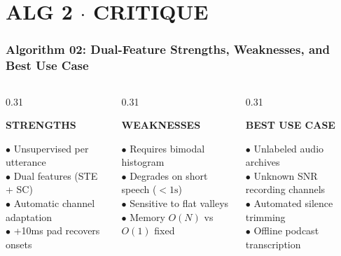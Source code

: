 \documentclass[aspectratio=169, 10pt]{beamer}
\begin{document}
\section{ALG 2 $\cdot$ CRITIQUE}
\begin{frame}
  \frametitle{Algorithm 02: Dual-Feature Strengths, Weaknesses, and Best Use Case}
  \begin{tcolorbox}[contentframe]
  \begin{columns}[T]
    \begin{column}{0.31\textwidth}
      \begin{tcolorbox}[mintcard, height=3.85cm, valign=top]
        \centering
        {\fontsize{9.5pt}{11pt}\selectfont\color{mintGreen}\textbf{STRENGTHS}}\\[4pt]
        \raggedright{\fontsize{8.5pt}{10pt}\selectfont
        $\bullet$ Unsupervised per utterance\\[3pt]
        $\bullet$ Dual features (STE + SC)\\[3pt]
        $\bullet$ Automatic channel adaptation\\[3pt]
        $\bullet$ +10ms pad recovers onsets}
      \end{tcolorbox}
    \end{column}

    \begin{column}{0.31\textwidth}
      \begin{tcolorbox}[warncard, height=3.85cm, valign=top]
        \centering
        {\fontsize{9.5pt}{11pt}\selectfont\color{amberWarn}\textbf{WEAKNESSES}}\\[4pt]
        \raggedright{\fontsize{8.5pt}{10pt}\selectfont
        $\bullet$ Requires bimodal histogram\\[3pt]
        $\bullet$ Degrades on short speech ($<1\text{s}$)\\[3pt]
        $\bullet$ Sensitive to flat valleys\\[3pt]
        $\bullet$ Memory $O(N)$ vs $O(1)$ fixed}
      \end{tcolorbox}
    \end{column}

    \begin{column}{0.31\textwidth}
      \begin{tcolorbox}[glowcard, height=3.85cm, valign=top]
        \centering
        {\fontsize{9.5pt}{11pt}\selectfont\color{cyanGlow}\textbf{BEST USE CASE}}\\[4pt]
        \raggedright{\fontsize{8.5pt}{10pt}\selectfont
        $\bullet$ Unlabeled audio archives\\[3pt]
        $\bullet$ Unknown SNR recording channels\\[3pt]
        $\bullet$ Automated silence trimming\\[3pt]
        $\bullet$ Offline podcast transcription}
      \end{tcolorbox}
    \end{column}
  \end{columns}
  

\end{tcolorbox}
\end{frame}
\end{document}

